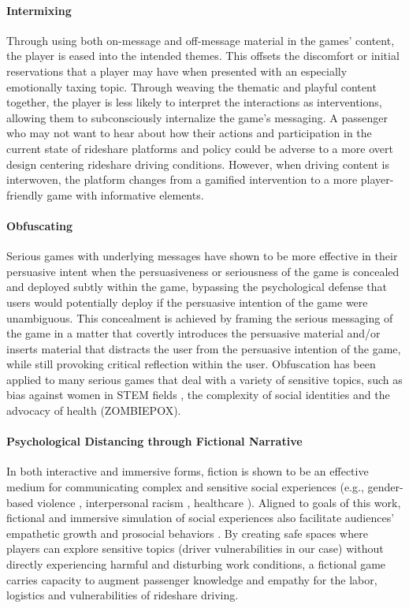 \paragraph{Intermixing} \label{intermix}
Through using both on-message and off-message material in the games' content, the player is eased into the intended themes. This offsets the discomfort or initial reservations that a player may have when presented with an especially emotionally taxing topic. Through weaving the thematic and playful content together, the player is less likely to interpret the interactions as interventions, allowing them to subconsciously internalize the game's messaging.  A passenger who may not want to hear about how their actions and participation in the current state of rideshare platforms and policy could be adverse to a more overt design centering rideshare driving conditions. However, when driving content is interwoven, the platform changes from a gamified intervention to a more player-friendly game with informative elements. 

\paragraph{Obfuscating} \label{obfuscate}
Serious games with underlying messages have shown to be more effective in their persuasive intent when the persuasiveness or seriousness of the game is concealed and deployed subtly within the game, bypassing the psychological defense that users would potentially deploy if the persuasive intention of the game were unambiguous. This concealment is achieved by framing the serious messaging of the game in a matter that covertly introduces the persuasive material and/or inserts material that distracts the user from the persuasive intention of the game, while still provoking critical reflection within the user. Obfuscation has been applied to many serious games that deal with a variety of sensitive topics, such as bias against women in STEM fields \cite{Freedman}, the complexity of social identities and the advocacy of health (ZOMBIEPOX). 
\paragraph{Psychological Distancing through Fictional Narrative} \label{distancing}
In both interactive and immersive forms, fiction is shown to be an effective medium for communicating complex and sensitive social experiences (e.g., gender-based violence \cite{standbyme}, interpersonal racism \cite{provotypes}, healthcare \cite{fun}). Aligned to goals of this work, fictional and immersive simulation of social experiences also facilitate audiences' empathetic growth and prosocial behaviors \cite{growth, intent, video, prosocial}. 
By creating safe spaces where players can explore sensitive topics (driver vulnerabilities in our case) without directly experiencing harmful and disturbing work conditions, a fictional game carries capacity to augment passenger knowledge and empathy for the labor, logistics and vulnerabilities of rideshare driving.



